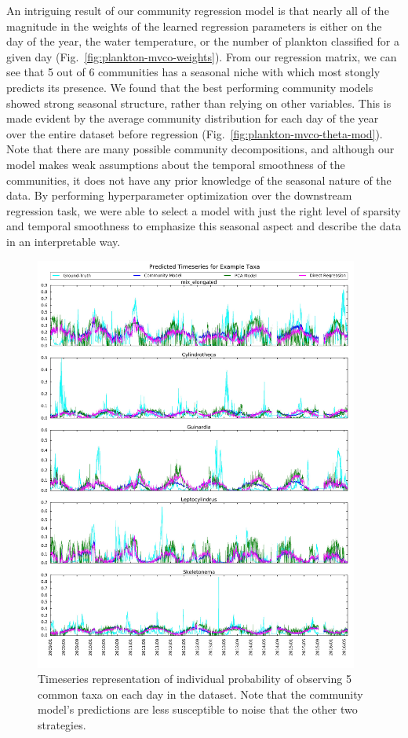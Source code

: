An intriguing result of our community regression model is that nearly all of the magnitude in the weights of the learned regression parameters is either on the day of the year, the water temperature, or the number of plankton classified for a given day (Fig.~\ref{fig:plankton-mvco-weights}). 
From our regression matrix, we can see that 5 out of 6 communities has a seasonal niche with which most stongly predicts its presence. We found that the best performing community models showed strong seasonal structure, rather than relying on other variables. This is made evident by the average community distribution for each day of the year over the entire dataset before regression (Fig.~\ref{fig:plankton-mvco-theta-mod}). Note that there are many possible community decompositions, and although our model makes weak assumptions about the temporal smoothness of the communities, it does not have any prior knowledge of the seasonal nature of the data. By performing hyperparameter optimization over the downstream regression task, we were able to select a model with just the right level of sparsity and temporal smoothness to emphasize this seasonal aspect and describe the data in an interpretable way.

\begin{figure}
	\centering
	\includegraphics[width=0.95\textwidth]{figures/oceans/timeseries.jpg}
	\caption{Timeseries representation of individual probability of observing 5 common taxa on each day in the dataset. Note that the community model's predictions are less susceptible to noise that the other two strategies.}
	\label{fig:plankton-mvco-timeseries}
\end{figure}


